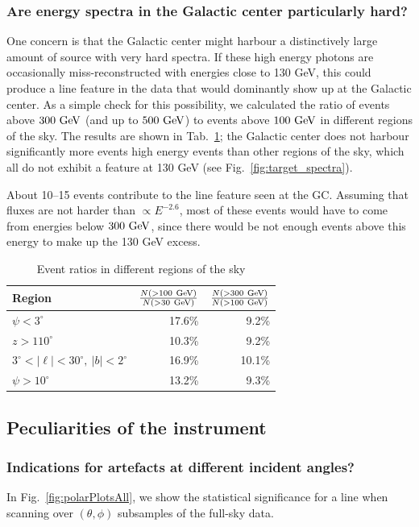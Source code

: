 \documentclass[aps,twocolumn,prd,superscriptaddress,showpacs,nofootinbib,fixfloat]{revtex4}
\newcommand{\GeV}{{\rm ~GeV}}
\begin{document}
\subsubsection{Are energy spectra in the Galactic center particularly hard?}

One concern is that the Galactic center might harbour a distinctively large
amount of source with very hard spectra. If these high energy photons are
occasionally miss-reconstructed with energies close to 130 GeV, this could
produce a line feature in the data that would dominantly show up at the
Galactic center. As a simple check for this possibility, we calculated the
ratio of events above $300\GeV$ (and up to $500\GeV$) to events above
$100\GeV$ in different regions of the sky. The results are shown in
Tab.~\ref{tab:eventRatios}; the Galactic center does not harbour significantly
more events high energy events than other regions of the sky, which all do not
exhibit a feature at 130 GeV (see Fig.~\ref{fig:target_spectra}). 

About 10--15 events contribute to the line feature seen at the GC. Assuming
that fluxes are not harder than $\propto E^{-2.6}$, most of these events would
have to come from energies below $300\GeV$, since there would be not enough
events above this energy to make up the 130 GeV excess.

\begin{table}
  \begin{tabular}{lrr}
    \hline
    Region & $\frac{N(>100\GeV)}{N(>30\GeV)}$ & $\frac{N(>300\GeV)}{N(>100\GeV)}$\\
    \hline
    $\psi<3^\circ$ & 17.6\% & 9.2\% \\
    $z>110^\circ$  & 10.3\% & 9.2\% \\
    $3^\circ < |\ell| < 30^\circ,\ |b|<2^\circ$ & 16.9\% & 10.1\% \\
    $\psi>10^\circ$ & 13.2\% & 9.3\% \\
    \hline
  \end{tabular}
  \caption{Event ratios in different regions of the sky}
  \label{tab:eventRatios}
\end{table}

\subsection{Peculiarities of the instrument}

\subsubsection{Indications for artefacts at different incident angles?}
In Fig.~\ref{fig:polarPlotsAll}, we show the statistical significance for a
line when scanning over $(\theta, \phi)$ subsamples of the full-sky data.
\end{document}
